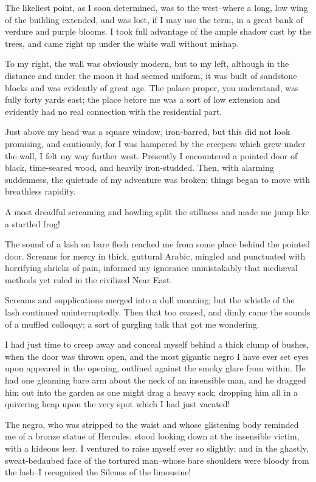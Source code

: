 The likeliest point, as I soon determined, was to the west--where a
long, low wing of the building extended, and was lost, if I may use
the term, in a great bank of verdure and purple blooms. I took full
advantage of the ample shadow cast by the trees, and came right up
under the white wall without mishap.

To my right, the wall was obviously modern, but to my left, although
in the distance and under the moon it had seemed uniform, it was built
of sandstone blocks and was evidently of great age. The palace proper,
you understand, was fully forty yards east; the place before me was a
sort of low extension and evidently had no real connection with the
residential part.

Just above my head was a square window, iron-barred, but this did not
look promising, and cautiously, for I was hampered by the creepers
which grew under the wall, I felt my way further west. Presently I
encountered a pointed door of black, time-seared wood, and heavily
iron-studded. Then, with alarming suddenness, the quietude of my
adventure was broken; things began to move with breathless rapidity.

A most dreadful screaming and howling split the stillness and made me
jump like a startled frog!

The sound of a lash on bare flesh reached me from some place behind
the pointed door. Screams for mercy in thick, guttural Arabic, mingled
and punctuated with horrifying shrieks of pain, informed my ignorance
unmistakably that mediæval methods yet ruled in the civilized Near
East.

Screams and supplications merged into a dull moaning; but the whistle
of the lash continued uninterruptedly. Then that too ceased, and dimly
came the sounds of a muffled colloquy; a sort of gurgling talk that
got me wondering.

I had just time to creep away and conceal myself behind a thick clump
of bushes, when the door was thrown open, and the most gigantic negro
I have ever set eyes upon appeared in the opening, outlined against
the smoky glare from within. He had one gleaming bare arm about the
neck of an insensible man, and he dragged him out into the garden as
one might drag a heavy sack; dropping him all in a quivering heap upon
the very spot which I had just vacated!

The negro, who was stripped to the waist and whose glistening body
reminded me of a bronze statue of Hercules, stood looking down at the
insensible victim, with a hideous leer. I ventured to raise myself
ever so slightly; and in the ghastly, sweat-bedaubed face of the
tortured man--whose bare shoulders were bloody from the lash--I
recognized the Silenus of the limousine!

